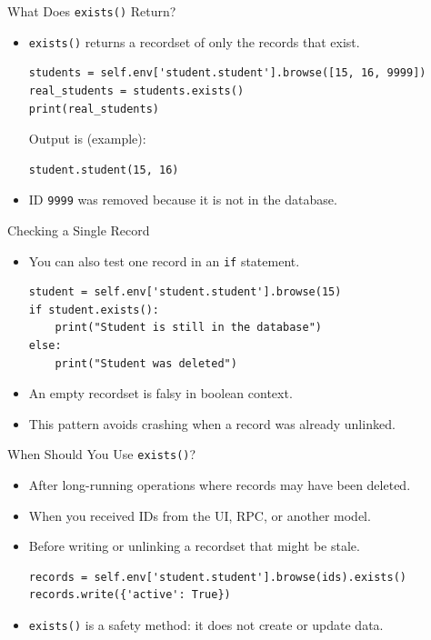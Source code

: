 \begin{frame}[fragile]{What Does \texttt{exists()} Return?}
	\begin{block}{}
		\begin{itemize}
			\item \texttt{exists()} returns a recordset of only the records that exist.
\begin{lstlisting}
students = self.env['student.student'].browse([15, 16, 9999])
real_students = students.exists()
print(real_students)
\end{lstlisting}
			Output is (example):
\begin{lstlisting}
student.student(15, 16)
\end{lstlisting}
			\item ID \texttt{9999} was removed because it is not in the database.
		\end{itemize}
	\end{block}
\end{frame}

\begin{frame}[fragile]{Checking a Single Record}
	\begin{itemize}
		\item You can also test one record in an \texttt{if} statement.
\begin{lstlisting}
student = self.env['student.student'].browse(15)
if student.exists():
	print("Student is still in the database")
else:
	print("Student was deleted")
\end{lstlisting}
		\item An empty recordset is falsy in boolean context.
		\item This pattern avoids crashing when a record was already unlinked.
	\end{itemize}
\end{frame}

\begin{frame}[fragile]{When Should You Use \texttt{exists()}?}
	\begin{itemize}
		\item After long-running operations where records may have been deleted.
		\item When you received IDs from the UI, RPC, or another model.
		\item Before writing or unlinking a recordset that might be stale.
\begin{lstlisting}
records = self.env['student.student'].browse(ids).exists()
records.write({'active': True})
\end{lstlisting}
		\item \texttt{exists()} is a safety method: it does not create or update data.
	\end{itemize}
\end{frame}

